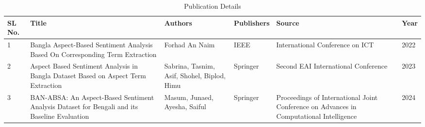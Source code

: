 \documentclass[a4paper,12pt]{article}
\begin{document}
\begin{table}[h]
    \centering
    \begin{tabular}{|p{1cm}|p{4cm}|p{3cm}|p{2cm}|p{2cm}|p{1cm}|}
        \hline
        SL No. & Title & Authors & Publishers & Source & Year  \\
        \hline
         1 & Bangla Aspect-Based Sentiment Analysis Based On Corresponding Term Extraction\cite{first} & Forhad An Naim & IEEE & International Conference on ICT & 2022 \\
        \hline
        2 & Aspect Based Sentiment Analysis in Bangla Dataset Based on Aspect Term Extraction\cite{second} & Sabrina, Tasnim, Asif, Shohel, Biplod, Himu & Springer & Second EAI International Conference & 2023 \\
        \hline
        3 & BAN-ABSA: An Aspect-Based Sentiment Analysis Dataset for Bengali and its Baseline Evaluation\cite{third} & Masum, Junaed, Ayesha, Saiful & Springer & Proceedings of International Joint Conference on Advances in Computational Intelligence & 2024 \\
        \hline
    \end{tabular}
    \caption{Publication Details}
    \label{tab:publication_details}
\end{table}
\end{document}
